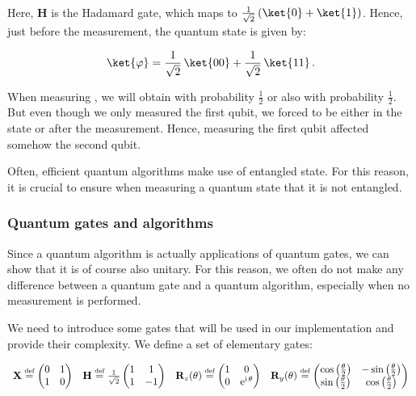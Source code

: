 \documentclass[11pt, a4paper]{article}
\begin{document}
                Here, \(\mathbf{H}\) is the Hadamard gate, which maps  to \(\frac{1}{\sqrt{2}}\,(\ket{0} + \ket{1})\). Hence, just before the measurement, the quantum state is given by:
                
                \[\ket{\varphi}=\frac{1}{\sqrt{2}}\,\ket{00} + \frac{1}{\sqrt{2}}\,\ket{11}\,.\]
                
                When measuring \ket{\varphi}, we will obtain   with probability \(\frac12\) or  also with probability \(\frac12\). But even though we only measured the first qubit, we forced \ket{\varphi} to be either in the state  or  after the measurement. Hence, measuring the first qubit affected somehow the second qubit.
                
                Often, efficient quantum algorithms make use of entangled state. For this reason, it is crucial to ensure when measuring a quantum state that it is not entangled.
            \subsubsection{Quantum gates and algorithms}
                Since a quantum algorithm is actually applications of quantum gates, we can show that it is of course also unitary. For this reason, we often do not make any difference between a quantum gate and a quantum algorithm, especially when no measurement is performed.
                
                We need to introduce some gates that will be used in our implementation and provide their complexity. We define a set of elementary gates:
                
                \[\begin{array}{ccccccc}\X\overset{\text{\tiny{def}}}{=}\begin{pmatrix}0 & 1\\1 & 0\end{pmatrix} & \mathbf{H}\overset{\text{\tiny{def}}}{=}\frac{1}{\sqrt{2}}\begin{pmatrix}1 & 1\\1 & -1\end{pmatrix}&\mathbf{R}_{z}(\theta)\overset{\text{\tiny{def}}}{=}\begin{pmatrix}1 & 0\\0 & \mathrm{e}^{\mathrm{i}\,\theta}\end{pmatrix}&\mathbf{R}_y(\theta)\overset{\text{\tiny{def}}}{=}\begin{pmatrix}\cos\left(\frac\theta2\right) & -\sin\left(\frac\theta2\right)\\\sin\left(\frac{\theta}{2}\right) & \cos\left(\frac\theta2\right)\end{pmatrix}\end{array}\]
                
\end{document}
